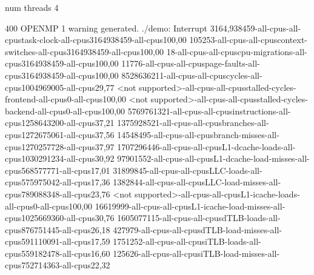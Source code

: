 num threads 4

400
OPENMP
1 warning generated.
./demo: Interrupt
3164,938459-all-cpus-all-cpustask-clock-all-cpus3164938459-all-cpus100,00
105253-all-cpus-all-cpuscontext-switches-all-cpus3164938459-all-cpus100,00
18-all-cpus-all-cpuscpu-migrations-all-cpus3164938459-all-cpus100,00
11776-all-cpus-all-cpuspage-faults-all-cpus3164938459-all-cpus100,00
8528636211-all-cpus-all-cpuscycles-all-cpus1004969005-all-cpus29,77
<not supported>-all-cpus-all-cpusstalled-cycles-frontend-all-cpus0-all-cpus100,00
<not supported>-all-cpus-all-cpusstalled-cycles-backend-all-cpus0-all-cpus100,00
5769761321-all-cpus-all-cpusinstructions-all-cpus1258643200-all-cpus37,21
1375928521-all-cpus-all-cpusbranches-all-cpus1272675061-all-cpus37,56
14548495-all-cpus-all-cpusbranch-misses-all-cpus1270257728-all-cpus37,97
1707296446-all-cpus-all-cpusL1-dcache-loads-all-cpus1030291234-all-cpus30,92
97901552-all-cpus-all-cpusL1-dcache-load-misses-all-cpus568577771-all-cpus17,01
31899845-all-cpus-all-cpusLLC-loads-all-cpus575975042-all-cpus17,36
1382844-all-cpus-all-cpusLLC-load-misses-all-cpus789088348-all-cpus23,76
<not supported>-all-cpus-all-cpusL1-icache-loads-all-cpus0-all-cpus100,00
16619999-all-cpus-all-cpusL1-icache-load-misses-all-cpus1025669360-all-cpus30,76
1605077115-all-cpus-all-cpusdTLB-loads-all-cpus876751445-all-cpus26,18
427979-all-cpus-all-cpusdTLB-load-misses-all-cpus591110091-all-cpus17,59
1751252-all-cpus-all-cpusiTLB-loads-all-cpus559182478-all-cpus16,60
125626-all-cpus-all-cpusiTLB-load-misses-all-cpus752714363-all-cpus22,32
